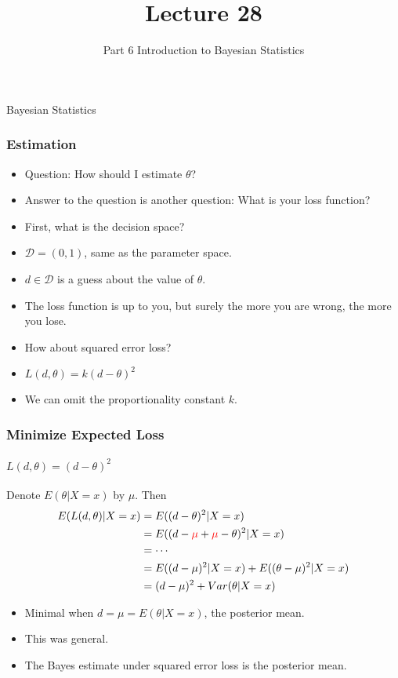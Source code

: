 \documentclass[12pt]{beamer}
\title[ECON2843]{Lecture 28}
\subtitle{Part 6 Introduction to Bayesian Statistics}
\date{}
\begin{document}
	\begin{frame}
		\titlepage
		
	\end{frame}
	\begin{frame}
		\vspace{1cm}
		\centering
		{\color{blue}\large Bayesian Statistics}
	\end{frame}
	
	\begin{frame}
		\frametitle{Estimation}
		
		\begin{itemize}[label={\color{blue}$\blacktriangleright$}]
			\item Question: How should I estimate $\theta$?
			\item Answer to the question is another question: What is your loss function?
			\item First, what is the decision space?
			\item $\mathcal{D} = (0,1)$, same as the parameter space.
			\item $d \in \mathcal{D}$ is a guess about the value of $\theta$.
			\item The loss function is up to you, but surely the more you are wrong, the more you lose.
			\item How about squared error loss?
			\item $L(d,\theta) = k(d-\theta)^2$
			\item We can omit the proportionality constant $k$.
		\end{itemize}
		
	\end{frame}
	\begin{frame}
		\frametitle{Minimize Expected Loss}
		\framesubtitle{$L(d,\theta) = (d-\theta)^2$}
		
		Denote $E(\theta|X = x)$ by $\mu$. Then
		\begin{align*}
			E(L(d,\theta)|X = x) &= E((d-\theta)^2|X = x) \\
			&= E((d-\color{red}\mu\color{black}+\color{red}\mu\color{black}-\theta)^2|X = x) \\
			&= \cdots \\
			&= E((d-\mu)^2|X = x) + E((\theta-\mu)^2|X = x) \\
			&= (d-\mu)^2 + Var(\theta|X = x)
		\end{align*}
		
		\begin{itemize}[label={\color{blue}$\blacktriangleright$}]
			\item Minimal when $d = \mu = E(\theta|X = x)$, the posterior mean.
			\item This was general.
			\item The Bayes estimate under squared error loss is the posterior mean.
		\end{itemize}
		
	\end{frame}
\end{document}
